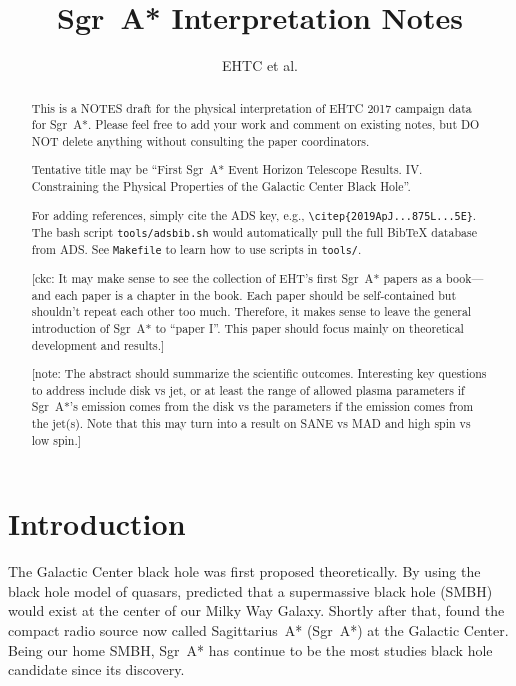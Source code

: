 \documentclass[twocolumn,tighten,dvipsnames]{aastex63}
\newcommand\sgra{Sgr~A*\xspace}
\newcommand\<{{\langle}}
\renewcommand\>{{\rangle}} %
\newcommand\note[1]{{\color{OliveGreen}[note: #1]}}
\newcommand\ckc[1]{{\color{MidnightBlue}[ckc: #1]}}
\begin{document}
\title{\sgra Interpretation Notes}
\author{EHTC et al.}

\shorttitle{\sgra Interpretation}

\revised{\today}

\begin{abstract}
  \color{BrickRed}

  This is a NOTES draft for the physical interpretation of EHTC 2017
  campaign data for \sgra.
  Please feel free to add your work and comment on existing notes, but
  DO NOT delete anything without consulting the paper coordinators.

  Tentative title may be ``First \sgra Event Horizon Telescope
  Results. IV. Constraining the Physical Properties of the Galactic
  Center Black Hole''.

  For adding references, simply cite the ADS key, e.g.,
  \texttt{\textbackslash citep\{2019ApJ...875L...5E\}}.
  The bash script \texttt{tools/adsbib.sh} would automatically pull
  the full BibTeX database from ADS.
  See \texttt{Makefile} to learn how to use scripts in
  \texttt{tools/}.

  \ckc{It may make sense to see the collection of EHT's first \sgra
    papers as a book---and each paper is a chapter in the book.
    Each paper should be self-contained but shouldn't repeat each
    other too much.
    Therefore, it makes sense to leave the general introduction of
    \sgra to ``paper I''.
    This paper should focus mainly on theoretical development and
    results.}

  \note{The abstract should summarize the scientific outcomes.
    Interesting key questions to address include disk vs jet, or at
    least the range of allowed plasma parameters if \sgra's emission
    comes from the disk vs the parameters if the emission comes from
    the jet(s).
    Note that this may turn into a result on SANE vs MAD and high spin
    vs low spin.}
\end{abstract}


\section{Introduction}
\label{sec:intro}

The Galactic Center black hole was first proposed theoretically.
By using the black hole model of quasars, \citet{1971MNRAS.152..461L}
predicted that a supermassive black hole (SMBH) would exist at the
center of our Milky Way Galaxy.
Shortly after that, \citet{1974ApJ...194..265B, 1975A&A....43..159E,
  1975ApJ...202L..63L} found the compact radio source now called
Sagittarius~A* (\sgra) at the Galactic Center.
Being our home SMBH, \sgra has continue to be the most studies black
hole candidate since its discovery.
\end{document}

